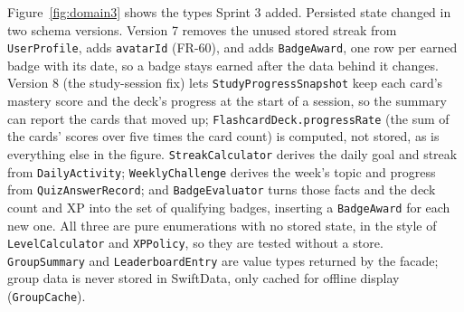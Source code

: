 \documentclass[12pt,letterpaper]{article}
\begin{document}
Figure~\ref{fig:domain3} shows the types Sprint 3 added. Persisted state changed
in two schema versions. Version 7 removes the unused stored streak from
\texttt{UserProfile}, adds \texttt{avatarId} (FR-60), and adds \texttt{BadgeAward}, one
row per earned badge with its date, so a badge stays earned after the data behind it
changes. Version 8 (the study-session fix) lets \texttt{StudyProgressSnapshot} keep
each card's mastery score and the deck's progress at the start of a session, so the
summary can report the cards that moved up; \texttt{FlashcardDeck.progressRate} (the
sum of the cards' scores over five times the card count) is computed, not stored, as
is everything else in the figure. \texttt{StreakCalculator} derives the daily goal
and streak from \texttt{DailyActivity}; \texttt{WeeklyChallenge} derives the week's
topic and progress from \texttt{QuizAnswerRecord}; and \texttt{BadgeEvaluator} turns
those facts and the deck count and XP into the set of qualifying badges, inserting a
\texttt{BadgeAward} for each new one. All three are pure enumerations with no stored
state, in the style of \texttt{LevelCalculator} and \texttt{XPPolicy}, so they are
tested without a store. \texttt{GroupSummary} and \texttt{LeaderboardEntry} are value
types returned by the facade; group data is never stored in SwiftData, only cached for
offline display (\texttt{GroupCache}).
\end{document}
